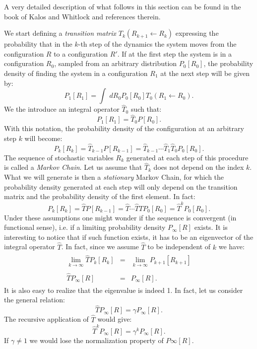A very detailed description of what follows in this section can be found in the book of Kalos and Whitlock\cite{Kalos08} and references therein. 

We start defining a {\it transition matrix} $T_k(R_{k+1}\leftarrow R_k)$ expressing the probability that in the $k$-th step of the dynamics the system moves from the configuration $R$ to a configuration $R'$. If at the first step the system is in a configuration $R_0$, sampled from an arbitrary distribution $P_0[R_0]$, the probability density of finding the system in a configuration $R_1$ at the next step will be given by:
\begin{equation}
P_1[R_1] = \int\; dR_0 P_0[R_0]T_0(R_1\leftarrow R_0).
\end{equation}
We the introduce an integral operator $\hat{T}_0$ such that:
\begin{equation}
P_1[R_1]=\hat{T}_0 P[R_0].
\end{equation}
With this notation, the probability density of the configuration at an
arbitrary step $k$ will become:
\begin{equation}
P_k[R_k]=\hat{T}_{k-1} P[R_{k-1}]=\hat{T}_{k-1}\cdots\hat{T}_{1}
\hat{T}_{0} P_0[R_0].
\end{equation}
The sequence of stochastic variables $R_k$ generated at each step of this procedure is called a {\it Markov Chain}. Let us assume that $\hat{T}_k$ does not depend on the index $k$. What we will generate is then a {\it stationary} Markov Chain, for which the probability density generated at each step will only depend on the transition matrix and the probability density of the first element. In fact:
\begin{equation}
P_k[R_k]=\hat{T} P[R_{k-1}]=\hat{T}\cdots\hat{T}
\hat{T} P_0[R_0]=\hat{T}^kP_0[R_0].
\end{equation}
Under these assumptions one might wonder if the sequence is convergent (in functional sense), i.e. if a limiting probability density $P_\infty[R]$ exists. It is interesting to notice that if such function exists, it has to be an eigenvector of the integral operator $\hat{T}$. In fact, since we assume $\hat{T}$ to be independent of $k$ we have:
\begin{eqnarray}
\begin{array}{rcl}
\lim_{k\rightarrow\infty}\hat{T}P_k[R_k]&=&\lim_{k\rightarrow\infty}P_{k+1}[R_{k+1}]\nonumber\\
\\
\hat{T}P_\infty[R]&=&P_\infty[R]\nonumber.
\end{array}
\end{eqnarray}
It is also easy to realize that the eigenvalue is indeed 1. In fact, let us consider the general relation:
\begin{equation}
\hat{T}P_\infty[R]=\gamma P_\infty[R].
\end{equation}
The recursive application of $\hat{T}$ would give:
\begin{equation}
\hat{T}^k P_\infty[R]=\gamma^kP_\infty[R].
\end{equation}
If $\gamma\neq 1$ we would lose the normalization property of $P\infty[R]$.

